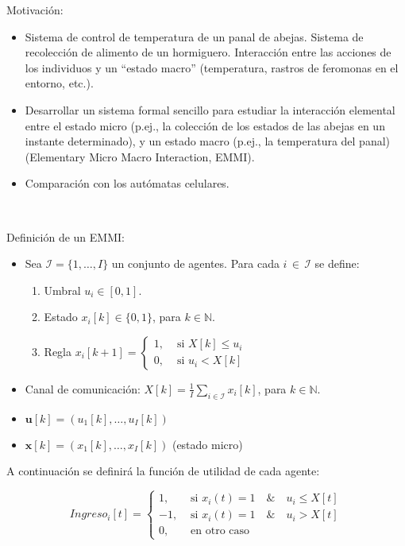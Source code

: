 \documentclass{article}
\begin{document}
Motivación: 
\begin{itemize}
\item Sistema de control de temperatura de un panal de abejas. Sistema de recolección de alimento de un hormiguero. Interacción entre las acciones de los individuos y un ``estado macro'' (temperatura, rastros de feromonas en el entorno, etc.).
\item Desarrollar un sistema formal sencillo para  estudiar la interacción elemental entre el estado micro (p.ej., la colección de los estados de las abejas en un instante determinado), y un estado macro (p.ej., la temperatura del panal) (Elementary Micro Macro Interaction, EMMI). 
\item Comparación con los autómatas celulares.
\end{itemize}

\

Definición de un EMMI:
\begin{itemize}
\item Sea $\mathcal{I}=\{1,\ldots,I\}$ un conjunto de agentes. Para cada $i\,{\in}\,\mathcal{I}$ se define:
	\begin{enumerate}[label=(\alph*)]
	\item Umbral $u_i\in[0,1]$.
	\item Estado $x_i[k]\in\{0, 1\}$, para $k\in\mathbb{N}$.
	\item Regla  $x_i[k+1]=\begin{cases} 1, & \mbox{ si }X[k]\leq u_i\\ 0, & \mbox{ si } u_i < X[k]\end{cases}$
	\end{enumerate}

\item Canal de comunicación: $X[k]=\frac{1}{I}\sum_{i\in\mathcal{I}} x_i[k]$, para $k\in\mathbb{N}$.
\end{itemize}

\begin{itemize}
\item $\bm{u}[k]= (u_1[k],\ldots,u_I[k])$
\item $\bm{x}[k]= (x_1[k],\ldots,x_I[k])$ (estado micro)
\end{itemize}

A continuación se definirá la función de utilidad de cada agente:

\begin{equation}
    Ingreso_i[t]=\begin{cases} 
1, & \mbox{ si  }x_i(t)=1 \quad \& \quad u_i\leq X[t] \\ 
-1, & \mbox{ si  }x_i(t)=1 \quad \& \quad u_i> X[t] \\ 
0, & \mbox{ en otro caso  }
\end{cases}
\end{equation}
\end{document}

